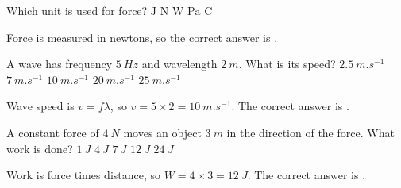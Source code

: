 \documentclass[full,print,12pt,a4paper]{physicsquiz}
\begin{document}
\begin{quizbank}
  \begin{quizquestion}[
    id=starter-version-units-001,
    topic=units,
    difficulty=foundation,
    marks=1,
    correct=B,
    tags={units,measurement},
    outcome={Match a physical quantity to its unit}
  ]
    Which unit is used for force?
    \choices
      {\(\mathrm{J}\)}
      {\(\mathrm{N}\)}
      {\(\mathrm{W}\)}
      {\(\mathrm{Pa}\)}
      {\(\mathrm{C}\)}
  \end{quizquestion}
  \begin{quizsolution}
    Force is measured in newtons, so the correct answer is \quizcorrectletter.
  \end{quizsolution}

  \begin{quizquestion}[
    id=starter-version-waves-001,
    topic=waves,
    difficulty=applied,
    marks=1,
    correct=C,
    tags={waves,speed}
  ]
    A wave has frequency \(\SI{5}{Hz}\) and wavelength \(\SI{2}{m}\). What is its speed?
    \choices
      {\(\SI{2.5}{m.s^{-1}}\)}
      {\(\SI{7}{m.s^{-1}}\)}
      {\(\SI{10}{m.s^{-1}}\)}
      {\(\SI{20}{m.s^{-1}}\)}
      {\(\SI{25}{m.s^{-1}}\)}
  \end{quizquestion}
  \begin{quizsolution}
    Wave speed is \(v=f\lambda\), so \(v=5\times2=\SI{10}{m.s^{-1}}\).
    The correct answer is \quizcorrectletter.
  \end{quizsolution}

  \begin{quizquestion}[
    id=starter-version-energy-001,
    topic=energy,
    difficulty=challenge,
    marks=1,
    correct=D,
    tags={energy,work}
  ]
    A constant force of \(\SI{4}{N}\) moves an object \(\SI{3}{m}\) in the direction of the force. What work is done?
    \choices
      {\(\SI{1}{J}\)}
      {\(\SI{4}{J}\)}
      {\(\SI{7}{J}\)}
      {\(\SI{12}{J}\)}
      {\(\SI{24}{J}\)}
  \end{quizquestion}
  \begin{quizsolution}
    Work is force times distance, so \(W=4\times3=\SI{12}{J}\).
    The correct answer is \quizcorrectletter.
  \end{quizsolution}
\end{quizbank}




\makequiztitle
\printquizquestions[1]

\begin{quizanswerkeycontent}
  \clearpage
  \printquizanswerkey
\end{quizanswerkeycontent}

\begin{quizsolutioncontent}
  \clearpage
  \printquizsolutions
\end{quizsolutioncontent}
\end{document}
